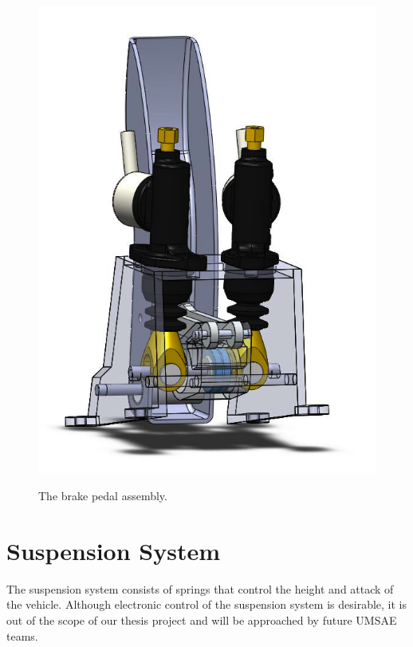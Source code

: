 \begin{figure}[h!]
{			\label{fig:brake_pedal_assy_b}\includegraphics[scale=0.4]{Figures/brake_pedal_assy_b.png}}
    \caption{The brake pedal assembly.}
    \label{fig:brake_pedal_assy}
\end{figure}

\section{Suspension System}

The suspension system consists of springs that control the height and attack of the vehicle. Although electronic control of the suspension system is desirable, it is out of the scope of our thesis project and will be approached by future UMSAE teams.
